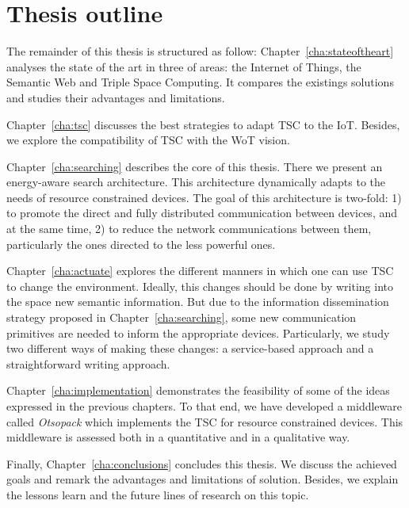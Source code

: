 \section{Thesis outline}
\label{sec:Outline}

The remainder of this thesis is structured as follow:
Chapter~\ref{cha:stateoftheart} analyses the state of the art in three of areas:
the Internet of Things, the Semantic Web and Triple Space Computing.
It compares the existings solutions and studies their advantages and limitations.

Chapter~\ref{cha:tsc} discusses the best strategies to adapt TSC to the IoT.
Besides, we explore the compatibility of TSC with the WoT vision.

Chapter~\ref{cha:searching} describes the core of this thesis.
There we present an energy-aware search architecture.
This architecture dynamically adapts to the needs of resource constrained devices.
The goal of this architecture is two-fold:
1) to promote the direct and fully distributed communication between devices,
and at the same time,
2) to reduce the network communications between them, particularly the ones directed to the less powerful ones.

Chapter~\ref{cha:actuate} explores the different manners in which one can use TSC to change the environment.
Ideally, this changes should be done by writing into the space new semantic information.
But due to the information dissemination strategy proposed in Chapter~\ref{cha:searching},
some new communication primitives are needed to inform the appropriate devices.
Particularly, we study two different ways of making these changes:
a service-based approach and a straightforward writing approach. %

Chapter~\ref{cha:implementation} demonstrates the feasibility of some of the ideas expressed in the previous chapters.
To that end, we have developed a middleware called \emph{Otsopack} which implements the TSC for resource constrained devices.
This middleware is assessed both in a quantitative and in a qualitative way. %

Finally, Chapter~\ref{cha:conclusions} concludes this thesis.
We discuss the achieved goals and remark the advantages and limitations of solution.
Besides, we explain the lessons learn and the future lines of research on this topic.
